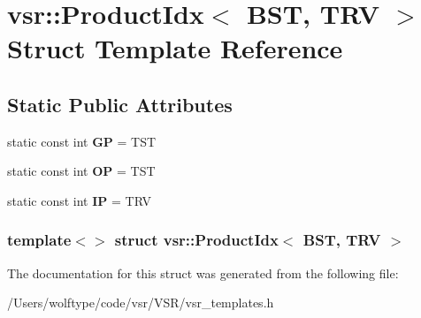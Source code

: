 \hypertarget{structvsr_1_1_product_idx_3_01_b_s_t_00_01_t_r_v_01_4}{\section{vsr\-:\-:Product\-Idx$<$ B\-S\-T, T\-R\-V $>$ Struct Template Reference}
\label{structvsr_1_1_product_idx_3_01_b_s_t_00_01_t_r_v_01_4}
}
\subsection*{Static Public Attributes}
\begin{DoxyCompactItemize}
\item 
\hypertarget{structvsr_1_1_product_idx_3_01_b_s_t_00_01_t_r_v_01_4_a13b5520545cd88727e27945b014553c9}{static const int {\bfseries G\-P} = T\-S\-T}\label{structvsr_1_1_product_idx_3_01_b_s_t_00_01_t_r_v_01_4_a13b5520545cd88727e27945b014553c9}

\item 
\hypertarget{structvsr_1_1_product_idx_3_01_b_s_t_00_01_t_r_v_01_4_a53ea311bb47835912dd4dcd6cd94a2e8}{static const int {\bfseries O\-P} = T\-S\-T}\label{structvsr_1_1_product_idx_3_01_b_s_t_00_01_t_r_v_01_4_a53ea311bb47835912dd4dcd6cd94a2e8}

\item 
\hypertarget{structvsr_1_1_product_idx_3_01_b_s_t_00_01_t_r_v_01_4_a2eaf2dbe2aa80baef310ca721e594f7e}{static const int {\bfseries I\-P} = T\-R\-V}\label{structvsr_1_1_product_idx_3_01_b_s_t_00_01_t_r_v_01_4_a2eaf2dbe2aa80baef310ca721e594f7e}

\end{DoxyCompactItemize}
\subsubsection*{template$<$$>$ struct vsr\-::\-Product\-Idx$<$ B\-S\-T, T\-R\-V $>$}



The documentation for this struct was generated from the following file\-:\begin{DoxyCompactItemize}
\item 
/\-Users/wolftype/code/vsr/\-V\-S\-R/vsr\-\_\-templates.\-h\end{DoxyCompactItemize}
